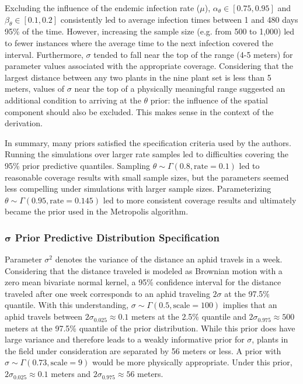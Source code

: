 \documentclass{uwstat572}
\begin{document}
Excluding the influence of the endemic infection rate ($\mu$), $\alpha_{\theta} \in [0.75, 0.95]$ and $\beta_{\theta} \in [0.1, 0.2]$  consistently led to average infection times between 1 and 480 days 95\% of the time.  
However, increasing the sample size (e.g. from 500 to 1,000) led to fewer instances where the average time to the next infection covered the interval. 
Furthermore, $\sigma$ tended to fall near the top of the range (4-5 meters) for parameter values associated with the appropriate coverage. 
Considering that the largest distance between any two plants in the nine plant set is less than 5 meters, values of $\sigma$ near the top of a physically meaningful range suggested an additional condition to arriving at the $\theta$ prior: the influence of the spatial component should also be excluded. 
This makes sense in the context of the derivation. 

In summary, many priors satisfied the specification criteria used by the authors. 
Running the simulations over larger rate samples led to difficulties covering the 95\% prior predictive quantiles.
Sampling $\theta \sim \Gamma(0.8, \text{rate}=0.1)$ led to reasonable coverage results with small sample sizes, but the parameters seemed less compelling under simulations with larger sample sizes.
Parameterizing $\theta \sim \Gamma(0.95, \text{rate}=0.145)$ led to more consistent coverage results and ultimately became the prior used in the Metropolis algorithm. 

\subsubsection{$\boldsymbol{\sigma}$ Prior Predictive Distribution Specification}
Parameter $\sigma^2$ denotes the variance of the distance an aphid travels in a week.
Considering that the distance traveled is modeled as Brownian motion with a zero mean bivariate normal kernel, a 95\% confidence interval for the distance traveled after one week corresponds to an aphid traveling $2\sigma$ at the 97.5\% quantile. 
With this understanding, $\sigma \sim \Gamma(0.5, \text{scale}=100)$ implies that an aphid travels between $2\sigma_{0.025} \approx 0.1$ meters at the 2.5\% quantile and $2\sigma_{0.975} \approx 500$ meters at the 97.5\% quantile of the prior distribution. 
While this prior does have large variance and therefore leads to a weakly informative prior for $\sigma$, plants in the field under consideration are separated by 56 meters or less. 
A prior with $\sigma \sim \Gamma(0.73, \text{scale}=9)$ would be more physically appropriate. 
Under this prior, $2\sigma_{0.025} \approx 0.1$ meters and $2\sigma_{0.975} \approx 56$ meters. 
\end{document}
